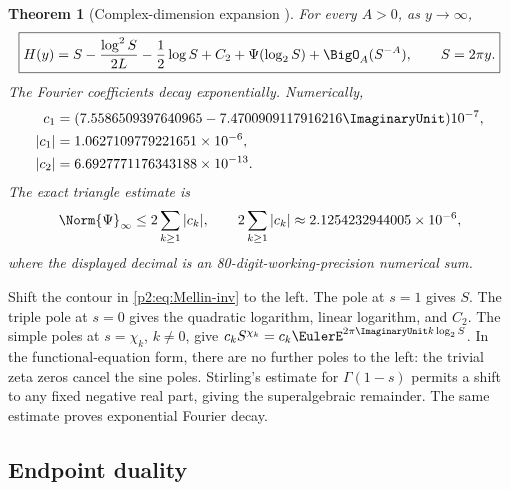 \documentclass[11pt]{article}
\numberwithin{equation}{section}
\newtheorem{theorem}{Theorem}[section]
\theoremstyle{definition}
\theoremstyle{remark}
\begin{document}
\begin{theorem}[Complex-dimension expansion \NewResult]
\label{p2:thm:H-asymp}
For every $A>0$, as $y\to\infty$,
\begin{equation}
 \boxed{
 H(y)=S-\frac{\log^2S}{2L}-\frac12\log S+C_2
      +\Psi(\log_2S)+\BigO_A(S^{-A}),\qquad S=2\pi y.}    \label{p2:eq:H-asymp}
\end{equation}
The Fourier coefficients decay exponentially.  Numerically,
\begin{align}
 c_1&=(7.5586509397640965-7.4700909117916216\ImaginaryUnit)10^{-7},\nonumber\\
 |c_1|&=1.0627109779221651\times10^{-6},\nonumber\\
 |c_2|&=6.6927771176343188\times10^{-13}.                 \label{p2:eq:cnum}
\end{align}
The exact triangle estimate is
\begin{equation}
 \Norm{\Psi}_\infty\le2\sum_{k\ge1}|c_k|,
 \qquad
 2\sum_{k\ge1}|c_k|\approx2.1254232944005\times10^{-6}, \label{p2:eq:Psi-bound}
\end{equation}
where the displayed decimal is an 80-digit-working-precision numerical sum.
\end{theorem}

\begin{proofidea}
Shift the contour in \eqref{p2:eq:Mellin-inv} to the left.  The pole at $s=1$
gives $S$.  The triple pole at $s=0$ gives the quadratic logarithm, linear
logarithm, and $C_2$.  The simple poles at $s=\chi_k$, $k\ne0$, give
$c_kS^{\chi_k}=c_k\EulerE^{2\pi\ImaginaryUnit k\log_2S}$.  In the functional-equation form,
there are no further poles to the left: the trivial zeta zeros cancel the sine
poles.  Stirling's estimate for $\Gamma(1-s)$ permits a shift to any fixed
negative real part, giving the superalgebraic remainder.  The same estimate
proves exponential Fourier decay.
\end{proofidea}

\subsection{Endpoint duality}
\end{document}
